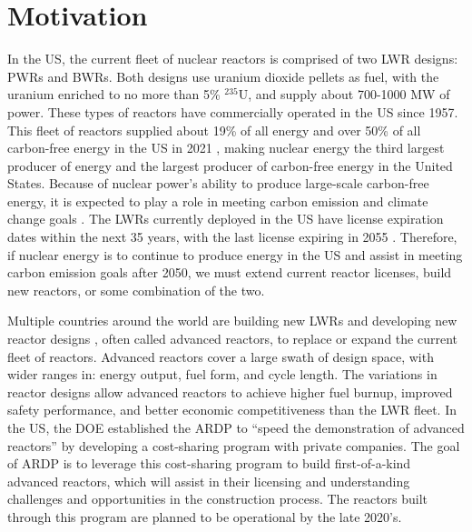 \section{Motivation}
In the US, the current fleet of nuclear reactors is comprised 
of two \gls{LWR} designs: \glspl{PWR} and \glspl{BWR}. 
Both designs use uranium dioxide pellets as fuel, with the uranium 
enriched to no more than 5\% $^{235}$U, and supply about 700-1000 MW of 
power. These types of reactors 
have commercially operated in the US since 1957. This fleet of 
reactors supplied about 19\% of all energy and over 50\%  
of all carbon-free energy in the US in 2021 
\cite{us_energy_information_administration_electricity_2022}, making nuclear 
energy the third largest producer of energy and the largest 
producer of carbon-free energy in the United States. Because of nuclear 
power's ability to produce large-scale carbon-free energy, it is 
expected to play a role in meeting carbon emission and climate change 
goals \cite{nea_meeting_2022}. The \glspl{LWR} 
currently deployed in the US have license expiration dates within 
the next 35 years, with the last license expiring in 2055 
\cite{nuclear_energy_institute_us_2021}. Therefore, if nuclear energy is 
to continue to produce energy in the US and assist in meeting carbon 
emission goals after 2050, we must extend current reactor licenses,  
build new reactors, or some combination of the two. 

Multiple countries around the world are building new \glspl{LWR}
\cite{world_nuclear_association_plans_2022} and developing
new reactor designs \cite{hussain_advances_2018}, often called 
advanced reactors, to 
replace or expand the current fleet of reactors. Advanced reactors 
cover a large swath of design space, with wider ranges in: energy output, 
fuel form, and cycle length. The variations in reactor designs allow 
advanced reactors to achieve higher fuel burnup, improved safety 
performance, and better economic competitiveness than the \gls{LWR} fleet. 
In the US, the \gls{DOE} established the \gls{ARDP} 
\cite{us_department_of_energy_office_of_nuclear_energy_advanced_nodate}
to ``speed the demonstration of advanced reactors'' 
\cite{us_department_of_energy_office_of_nuclear_energy_advanced_nodate}
by developing a cost-sharing program with private companies. The goal of 
\gls{ARDP} is to leverage this cost-sharing program to build 
first-of-a-kind advanced reactors, which will assist in their licensing and 
understanding challenges and opportunities in the construction process. 
The reactors built through this program are planned to be operational 
by the late 2020's.

